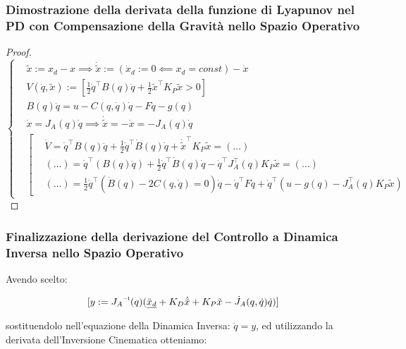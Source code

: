 \subsubsection{Dimostrazione della derivata della funzione di Lyapunov nel PD con Compensazione della Gravità nello Spazio Operativo}

\begin{proof}

\[
	\left\{
	\begin{aligned}
	&\tilde{x} := x_d-x \implies \dot{\tilde{x}} := (\dot{x}_d := 0 \impliedby x_d=const) - \dot{x}\\
	&V(\dot{q},\tilde{x}) := [\frac{1}{2}\dot{q}^\top B(q)\dot{q} + \frac{1}{2}\tilde{x}^\top K_P\tilde{x} > 0]\\
	&B(q)\ddot{q} = u - C(q,\dot{q})\dot{q} - F\dot{q} - g(q)\\
	&\dot{x}=J_A(q)\dot{q} \implies \dot{\tilde{x}} = -\dot{x} = -J_A(q)\dot{q}\\
	&\left[
	\begin{aligned}
	&\dot{V} = \dot{q}^\top B(q)\ddot{q} + \frac{1}{2}\dot{q}^\top\dot{B}(q)\dot{q} + \dot{\tilde{x}}^\top K_P\tilde{x} = (\dots)\\
	&(\dots) = \dot{q}^\top(B(q)\ddot{q}) + \frac{1}{2}\dot{q}^\top\dot{B}(q)\dot{q} - \dot{q}^\top J_A^\top(q)K_P\tilde{x} = (\dots)\\
	&(\dots) = \frac{1}{2}\dot{q}^\top(\dot{B}(q) - 2C(q,\dot{q}) = 0)\dot{q} - \dot{q}^\top F\dot{q} + \dot{q}^\top(u-g(q)-J_A^\top(q)K_P\tilde{x})
	\end{aligned}
	\right.
	\end{aligned}
	\right.
\]

\end{proof}

\subsubsection{Finalizzazione della derivazione del Controllo a Dinamica Inversa nello Spazio Operativo}

Avendo scelto:

\[	
	[y := \inv{J_A}(q)(\underline{\ddot{x}_d} + K_D\dot{\tilde{x}} + K_P\tilde{x} - \dot{J}_A(q,\dot{q})\dot{q})]
\]

sostituendolo nell'equazione della Dinamica Inversa: $\ddot{q}=y$, ed utilizzando la derivata dell'Inversione Cinematica otteniamo:

